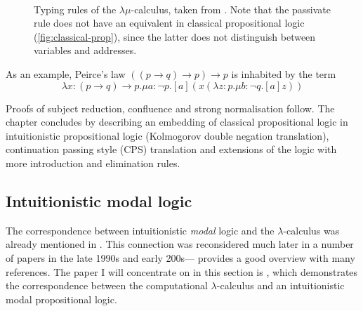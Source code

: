 \documentclass[12pt,toc=bibliography,numbers=noendperiod,
               footnotes=multiple,twoside]{scrartcl}
\begin{document}
\begin{figure}
\begin{minipage}[b]{.5\linewidth}
\begin{prooftree}
        \end{prooftree}
    \end{minipage}
    \\
    \vspace{10pt}
    \begin{minipage}[b]{.5\linewidth}
        \begin{prooftree}
        \end{prooftree}
    \end{minipage}
    \caption{Typing rules of the \(\lambda\mu\)-calculus, taken from \textcite[133]{sorensen_lectures_2006}. Note that the passivate rule does not have an equivalent in classical propositional logic (\cref{fig:classical-prop}), since the latter does not distinguish between variables and addresses.}
    \label{fig:lambda-mu-typing}
\end{figure}

As an example, Peirce's law \(((p \rightarrow q) \rightarrow p) \rightarrow p\) is inhabited by the term \[\lambda x:(p \rightarrow q) \rightarrow p.\mu a:\neg p.[a](x(\lambda z:p.\mu b:\neg q.[a]z))\]

Proofs of subject reduction, confluence and strong normalisation follow. The chapter concludes by describing an embedding of classical propositional logic in intuitionistic propositional logic (Kolmogorov double negation translation), continuation passing style (CPS) translation and extensions of the logic with more introduction and elimination rules.


\subsection{Intuitionistic modal logic}

The correspondence between intuitionistic \emph{modal} logic and the \(\lambda\)-calculus was already mentioned in \textcite{curry_elimination_1952}. This connection was reconsidered much later in a number of papers in the late 1990s and early 200s---\textcite{paiva_modalities_2004} provides a good overview with many references. The paper I will concentrate on in this section is \textcite{benton_computational_1995}, which demonstrates the correspondence between the computational \(\lambda\)-calculus \autocite{moggi_notions_1991} and an intuitionistic modal propositional logic.
\end{document}
